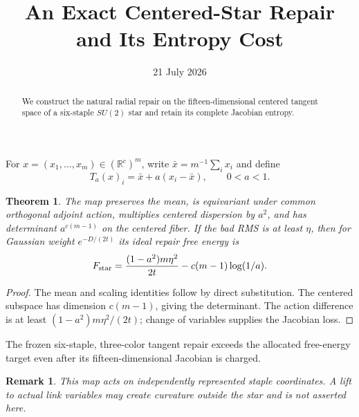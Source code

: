 \documentclass[11pt]{article}\usepackage[margin=1in]{geometry}\usepackage{amsmath,amssymb,amsthm}\newtheorem{theorem}{Theorem}\newtheorem{remark}{Remark}
\title{An Exact Centered-Star Repair and Its Entropy Cost}\author{}\date{21 July 2026}
\begin{document}
\maketitle
\begin{abstract}We construct the natural radial repair on the fifteen-dimensional centered tangent space of a six-staple $SU(2)$ star and retain its complete Jacobian entropy.\end{abstract}
For $x=(x_1,\ldots,x_m)\in(\mathbb R^c)^m$, write $\bar x=m^{-1}\sum_i x_i$ and define
\[T_a(x)_i=\bar x+a(x_i-\bar x),\qquad 0<a<1.\]
\begin{theorem}The map preserves the mean, is equivariant under common orthogonal adjoint action, multiplies centered dispersion by $a^2$, and has determinant $a^{c(m-1)}$ on the centered fiber. If the bad RMS is at least $\eta$, then for Gaussian weight $e^{-D/(2t)}$ its ideal repair free energy is
\[F_{\rm star}={(1-a^2)m\eta^2\over2t}-c(m-1)\log(1/a).\]
\end{theorem}
\begin{proof}The mean and scaling identities follow by direct substitution. The centered subspace has dimension $c(m-1)$, giving the determinant. The action difference is at least $(1-a^2)m\eta^2/(2t)$; change of variables supplies the Jacobian loss.\end{proof}
The frozen six-staple, three-color tangent repair exceeds the allocated free-energy target even after its fifteen-dimensional Jacobian is charged.
\begin{remark}This map acts on independently represented staple coordinates. A lift to actual link variables may create curvature outside the star and is not asserted here.\end{remark}
\end{document}
